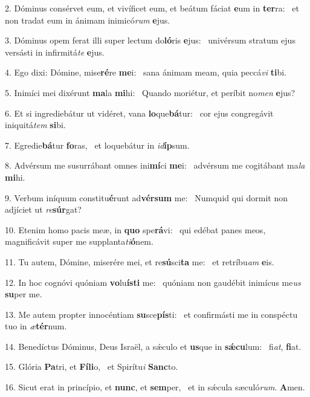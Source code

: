 2. Dóminus consérvet eum, et vivíficet eum, et beátum fáciat \textbf{e}um in \textbf{ter}ra: \ast\  et non tradat eum in ánimam inimicó\textit{rum} \textbf{e}jus.\

3. Dóminus opem ferat illi super lectum do\textbf{ló}ris \textbf{e}jus: \ast\  univérsum stratum ejus versásti in infirmitá\textit{te} \textbf{e}jus.\

4. Ego dixi: Dómine, mise\textbf{ré}re \textbf{me}i: \ast\  sana ánimam meam, quia peccá\textit{vi} \textbf{ti}bi.\

5. Inimíci mei dixérunt \textbf{ma}la \textbf{mi}hi: \ast\  Quando moriétur, et períbit no\textit{men} \textbf{e}jus?\

6. Et si ingrediebátur ut vidéret, vana \textbf{lo}que\textbf{bá}tur: \ast\  cor ejus congregávit iniquitá\textit{tem} \textbf{si}bi.\

7. Egredie\textbf{bá}tur \textbf{fo}ras, \ast\  et loquebátur in \textit{id}\textbf{íp}sum.\

8. Advérsum me susurrábant omnes ini\textbf{mí}ci \textbf{me}i: \ast\  advérsum me cogitábant ma\textit{la} \textbf{mi}hi.\

9. Verbum iníquum constitu\textbf{é}runt ad\textbf{vér}\textbf{sum} me: \ast\  Numquid qui dormit non adjíciet ut \textit{re}\textbf{súr}gat?\

10. Etenim homo pacis meæ, in \textbf{quo} spe\textbf{rá}vi: \ast\  qui edébat panes meos, magnificávit super me supplanta\textit{ti}\textbf{ó}nem.\

11. Tu autem, Dómine, miserére mei, et re\textbf{sú}sci\textbf{ta} me: \ast\  et retríbu\textit{am} \textbf{e}is.\

12. In hoc cognóvi quóniam \textbf{vo}lu\textbf{ís}\textbf{ti} me: \ast\  quóniam non gaudébit inimícus me\textit{us} \textbf{su}per me.\

13. Me autem propter innocéntiam \textbf{su}sce\textbf{pís}ti: \ast\  et confirmásti me in conspéctu tuo in \textit{æ}\textbf{tér}num.\

14. Benedíctus Dóminus, Deus Israël, a sǽculo et \textbf{us}que in \textbf{sǽ}\textbf{cu}lum: \ast\  fi\textit{at}, \textbf{fi}at.\

15. Glória \textbf{Pa}tri, et \textbf{Fí}\textbf{li}o, \ast\  et Spirítu\textit{i} \textbf{Sanc}to.\

16. Sicut erat in princípio, et \textbf{nunc}, et \textbf{sem}per, \ast\  et in sǽcula sæculó\textit{rum}. \textbf{A}men.\

